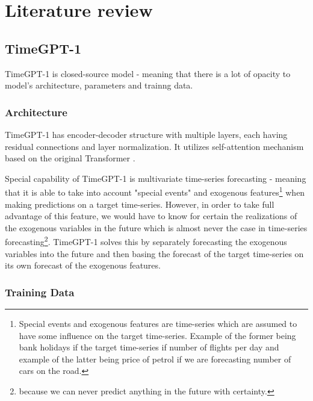 \section{Literature review} 


\subsection{TimeGPT-1 \cite{garza2023timegpt}}

TimeGPT-1 is closed-source model - meaning that there is a lot of opacity to model's architecture, parameters and trainng data.

\subsubsection{Architecture}

TimeGPT-1 has encoder-decoder structure with multiple layers, each having residual connections and layer normalization. It utilizes self-attention mechanism based on the original Transformer \cite{vaswani2017attention}. 

Special capability of TimeGPT-1 is multivariate time-series forecasting - meaning that it is able to take into account "special events" and exogenous features\footnote{Special events and exogenous features are time-series which are assumed to have some influence on the target time-series. Example of the former being bank holidays if the target time-series if number of flights per day and example of the latter being price of petrol if we are forecasting number of cars on the road.} when making predictions on a target time-series. However, in order to take full advantage of this feature, we would have to know for certain the realizations of the exogenous variables in the future which is almost never the case in time-series forecasting\footnote{because we can never predict anything in the future with certainty.}. TimeGPT-1 solves this by separately forecasting the exogenous variables into the future and then basing the forecast of the target time-series on its own forecast of the exogenous features. %

\subsubsection{Training Data}

